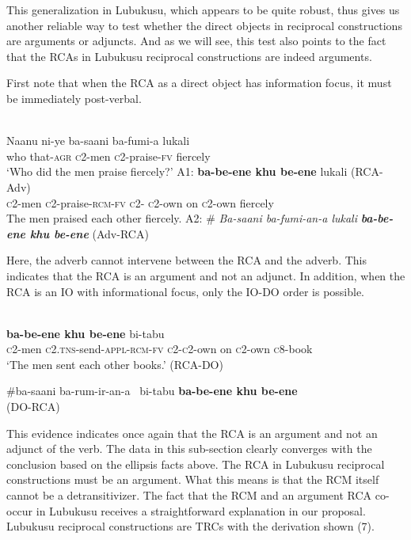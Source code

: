 \documentclass[output=paper]{langsci/langscibook}
\begin{document}
  This generalization in Lubukusu, which appears to be quite robust, thus gives us another reliable way to test whether the direct objects in reciprocal constructions are arguments or adjuncts. And as we will see, this test also points to the fact that the RCAs in Lubukusu reciprocal constructions are indeed  arguments.

First note that when the RCA as a direct object has information focus, it must be immediately post-verbal. 


\ea\label{ex:}
\\
\gll Naanu  ni-ye     ba-saani   ba-fumi-a   lukali \\
who   that-\textsc{agr}  \textsc{c}2-men   \textsc{c}2-praise-\textsc{fv}   fiercely \\
\glt ‘Who did the men praise fiercely?’
  A1: 
      \textbf{{ba-be-ene    khu be-ene}} {  lukali}    (RCA-Adv) \\     \textsc{c}2-men   \textsc{c}2-praise-\textsc{rcm-fv}       \textsc{c}2-\textsc{ c}2-own  on   \textsc{c}2-own  fiercely\\
\glt    The men praised each other fiercely.
  A2:   \#\textit{ Ba-saani ba-fumi-an-a   lukali}\textbf{\textit{       ba-be-ene khu be-ene}}     (Adv-RCA)  
\z


Here, the adverb cannot intervene between the RCA and the adverb. This indicates that the RCA is an argument and not an adjunct. In addition, when the RCA is an IO with informational focus, only the IO-DO order is possible.


\ea\label{ex:}
  \\
\ea
{}    \textbf{{ba-be-ene  khu be-ene}}  bi-tabu      \\
\textsc{c}2-men   \textsc{c2.tns}-send-\textsc{appl-rcm-fv}     \textsc{c2-c2}-own on   \textsc{c}2-own   \textsc{c}8-book       \\
\glt    ‘The men sent each other books.’          (RCA-DO)

\ex
   \#{ba-saani   ba-rum-ir-an-a~  bi-tabu}   \textbf{{ba-be-ene khu be-ene}}\\ 
\glt                      (DO-RCA)
\z
\z

This evidence indicates once again that the RCA is an argument and not an adjunct of the verb. The data in this sub-section clearly converges with the conclusion based on the ellipsis facts above. The RCA in Lubukusu reciprocal constructions must be an argument. What this means is that the RCM itself cannot be a detransitivizer. The fact that the RCM and an argument RCA co-occur in Lubukusu receives a straightforward explanation in our proposal. Lubukusu reciprocal constructions are TRCs with the derivation shown (7). 
\end{document}
